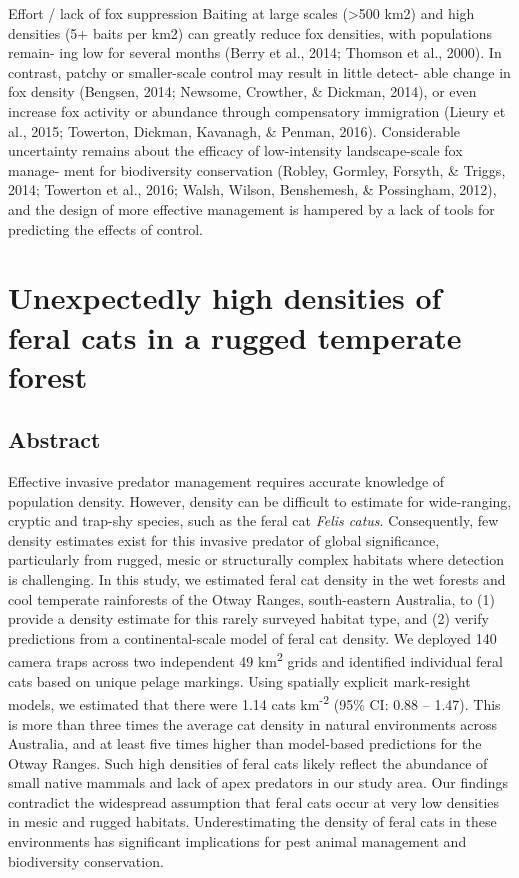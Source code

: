\documentclass[11pt,a4paper,titlepage,twoside,openright]{style/unimelbthesis}
\begin{document}
\begin{mainmatter}
Effort / lack of fox suppression
Baiting at large scales (\textgreater500 km2) and high densities (5+ baits per km2) can greatly reduce fox densities, with populations remain- ing low for several months (Berry et al., 2014; Thomson et al., 2000). In contrast, patchy or smaller-scale control may result in little detect- able change in fox density (Bengsen, 2014; Newsome, Crowther, \& Dickman, 2014), or even increase fox activity or abundance through compensatory immigration (Lieury et al., 2015; Towerton, Dickman, Kavanagh, \& Penman, 2016). Considerable uncertainty remains about the efficacy of low-intensity landscape-scale fox manage- ment for biodiversity conservation (Robley, Gormley, Forsyth, \& Triggs, 2014; Towerton et al., 2016; Walsh, Wilson, Benshemesh, \& Possingham, 2012), and the design of more effective management is hampered by a lack of tools for predicting the effects of control.

\hypertarget{otways17}{%
\chapter{Unexpectedly high densities of feral cats in a rugged temperate forest}\label{otways17}}

\hypertarget{abstract}{%
\section*{Abstract}\label{abstract}}

Effective invasive predator management requires accurate knowledge of population density. However, density can be difficult to estimate for wide-ranging, cryptic and trap-shy species, such as the feral cat \emph{Felis catus}. Consequently, few density estimates exist for this invasive predator of global significance, particularly from rugged, mesic or structurally complex habitats where detection is challenging. In this study, we estimated feral cat density in the wet forests and cool temperate rainforests of the Otway Ranges, south-eastern Australia, to (1) provide a density estimate for this rarely surveyed habitat type, and (2) verify predictions from a continental-scale model of feral cat density. We deployed 140 camera traps across two independent 49 km\textsuperscript{2} grids and identified individual feral cats based on unique pelage markings. Using spatially explicit mark-resight models, we estimated that there were 1.14 cats km\textsuperscript{-2} (95\% CI: 0.88 -- 1.47). This is more than three times the average cat density in natural environments across Australia, and at least five times higher than model-based predictions for the Otway Ranges. Such high densities of feral cats likely reflect the abundance of small native mammals and lack of apex predators in our study area. Our findings contradict the widespread assumption that feral cats occur at very low densities in mesic and rugged habitats. Underestimating the density of feral cats in these environments has significant implications for pest animal management and biodiversity conservation.


\end{mainmatter}
\end{document}
